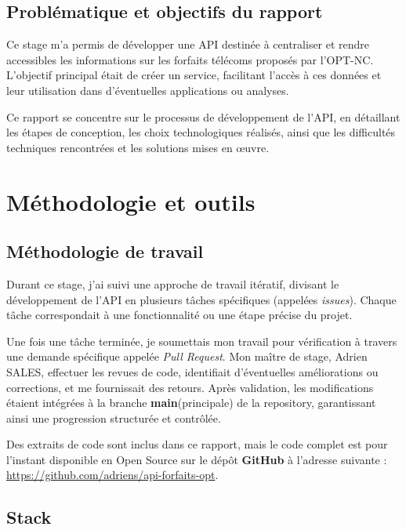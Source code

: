 \documentclass[11pt]{article}
\begin{document}
		\subsection{Problématique et objectifs du rapport}
		
		Ce stage m’a permis de développer une API destinée à centraliser et rendre accessibles les informations sur les forfaits télécoms proposés par l’OPT-NC. L’objectif principal était de créer un service, facilitant l’accès à ces données et leur utilisation dans d’éventuelles applications ou analyses.
		
		Ce rapport se concentre sur le processus de développement de l’API, en détaillant les étapes de conception, les choix technologiques réalisés, ainsi que les difficultés techniques rencontrées et les solutions mises en œuvre.
		
		\newpage
		\section{Méthodologie et outils}
		
		\subsection{Méthodologie de travail}
		
		Durant ce stage, j'ai suivi une approche de travail itératif, divisant le développement de l'API en plusieurs tâches spécifiques (appelées \textit{issues}). Chaque tâche correspondait à une fonctionnalité ou une étape précise du projet.
		
		Une fois une tâche terminée, je soumettais mon travail pour vérification à travers une demande spécifique appelée \textit{Pull Request}. Mon maître de stage, Adrien SALES, effectuer les revues de code, identifiait d'éventuelles améliorations ou corrections, et me fournissait des retours. Après validation, les modifications étaient intégrées à la branche \textbf{main}(principale) de la repository, garantissant ainsi une progression structurée et contrôlée.
		
		Des extraits de code sont inclus dans ce rapport, mais le code complet est pour l'instant disponible en Open Source sur le dépôt \textbf{GitHub} à l'adresse suivante : \url{https://github.com/adriens/api-forfaits-opt}.
		
		\subsection{Stack}
		
\end{document}
